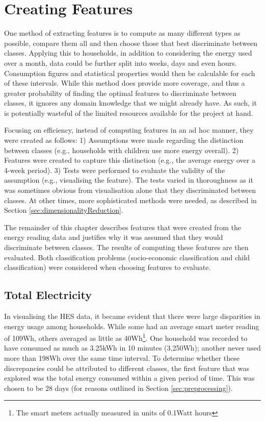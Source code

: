 

\section{Creating Features}
\label{sec:creatingFeatures}
One method of extracting features is to compute as many different types as possible, compare them all and then choose those that best discriminate between classes. Applying this to households, in addition to considering the energy used over a month, data could be further split into weeks, days and even hours. Consumption figures and statistical properties would then be calculable for each of these intervals. While this method does provide more coverage, and thus a greater probability of finding the optimal features to discriminate between classes, it ignores any domain knowledge that we might already have. As such, it is potentially wasteful of the limited resources available for the project at hand. 

Focusing on efficiency, instead of computing features in an ad hoc manner, they were created as follows: 1) Assumptions were made regarding the distinction between classes (e.g., households with children use more energy overall). 2) Features were created to capture this distinction (e.g., the average energy over a 4-week period). 3) Tests were performed to evaluate the validity of the assumption (e.g., visualising the feature). The tests varied in thoroughness as it was sometimes obvious from visualisation alone that they discriminated between classes. At other times, more sophisticated methods were needed, as described in Section \ref{sec:dimensionalityReduction}. %

The remainder of this chapter describes features that were created from the energy reading data and justifies why it was assumed that they would discriminate between classes. The results of computing these features are then evaluated. Both classification problems (socio-economic classification and child classification) were considered when choosing features to evaluate.

\subsection*{Total Electricity}
In visualising the HES data, it became evident that there were large disparities in energy usage among households. While some had an average smart meter reading of 109Wh, others averaged as little as 40Wh\footnote{The smart meters actually measured in units of 0.1Watt hours}. One household was recorded to have consumed as much as 3.25kWh in 10 minutes (3,250Wh); another never used more than 198Wh over the same time interval. To determine whether these discrepancies could be attributed to different classes, the first feature that was explored was the total energy consumed within a given period of time. This was chosen to be  28 days (for reasons outlined in Section \ref{sec:preprocessing}). 

